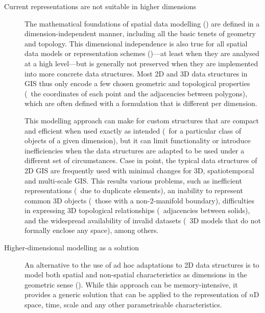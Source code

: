 \begin{description}


\item[Current representations are not suitable in higher dimensions]

The mathematical foundations of spatial data modelling () are defined in a dimension-independent manner, including all the basic tenets of geometry and topology.
This dimensional independence is also true for all spatial data models or representation schemes ()---at least when they are analysed at a high level---but is generally not preserved when they are implemented into more concrete data structures.
Most 2D and 3D data structures in GIS thus only encode a few chosen geometric and topological properties (\eg\ the coordinates of each point and the adjacencies between polygons), which are often defined with a formulation that is different per dimension.

This modelling approach can make for custom structures that are compact and efficient when used exactly as intended (\ie\ for a particular class of objects of a given dimension), but it can limit functionality or introduce inefficiencies when the data structures are adapted to be used under a different set of circumstances.
Case in point, the typical data structures of 2D GIS are frequently used with minimal changes for 3D, spatiotemporal and multi-scale GIS.\@
This results various problems, such as inefficient representations (\eg\ due to duplicate elements), an inability to represent common 3D objects (\eg\ those with a non-2-manifold boundary), difficulties in expressing 3D topological relationships (\eg\ adjacencies between solids), and the widespread availability of invalid datasets (\eg\ 3D models that do not formally enclose any space), among others.


\item[Higher-dimensional modelling as a solution]

An alternative to the use of ad hoc adaptations to 2D data structures is to model both spatial and non-spatial characteristics as dimensions in the geometric sense ().
While this approach can be memory-intensive, it provides a generic solution that can be applied to the representation of $n$D space, time, scale and any other parametrisable characteristics.


\end{description}
